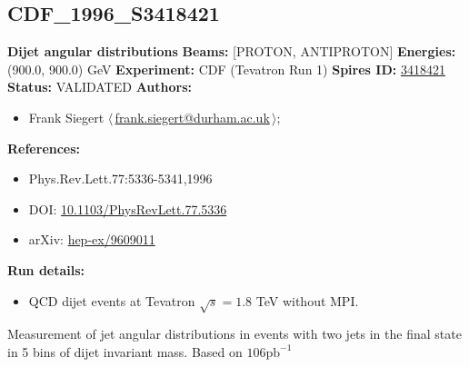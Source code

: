 \subsection[CDF\_1996\_S3418421]{CDF\_1996\_S3418421\,\cite{Abe:1996mj}}
\textbf{Dijet angular distributions}\newline
\textbf{Beams:} [PROTON, ANTIPROTON] \newline
\textbf{Energies:} (900.0, 900.0) GeV \newline
\textbf{Experiment:} CDF (Tevatron Run 1) \newline
\textbf{Spires ID:} \href{http://www.slac.stanford.edu/spires/find/hep/www?rawcmd=key+3418421}{3418421}\newline
\textbf{Status:} VALIDATED\newline
\textbf{Authors:}
\begin{itemize}
  \item Frank Siegert $\langle\,$\href{mailto:frank.siegert@durham.ac.uk}{frank.siegert@durham.ac.uk}$\,\rangle$;
\end{itemize}
\textbf{References:}
\begin{itemize}
  \item Phys.Rev.Lett.77:5336-5341,1996
  \item DOI: \href{http://dx.doi.org/10.1103/PhysRevLett.77.5336}{10.1103/PhysRevLett.77.5336}
  \item arXiv: \href{http://arxiv.org/abs/hep-ex/9609011}{hep-ex/9609011}
\end{itemize}
\textbf{Run details:}
\begin{itemize}

  \item QCD dijet events at Tevatron $\sqrt{s}=1.8$ TeV without MPI.\end{itemize}

\noindent Measurement of jet angular distributions in events with two jets in the final state in 5 bins of dijet invariant mass. Based on $106 \mathrm{pb}^{-1}$

\clearpage


\clearpage

